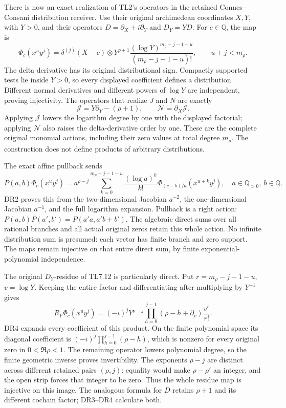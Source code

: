 There is now an exact realization of TL2's operators in the retained
Connes--Consani distribution receiver. Use their original archimedean
coordinates \(X,Y\), with \(Y>0\), and their operators
\(D=\partial_X+i\partial_Y\) and \(D_Y=YD\). For \(c\in\mathbb Q\), the
map is \[
\Phi_c(x^u y^j)=\delta^{(j)}(X-c)\otimes
Y^{\rho+1}\frac{(\log Y)^{m_\rho-j-1-u}}{(m_\rho-j-1-u)!},
\qquad u+j<m_\rho.
\tag{TL7.12}
\] The delta derivative has its original distributional sign. Compactly
supported tests lie inside \(Y>0\), so every displayed coefficient
defines a distribution. Different normal derivatives and different
powers of \(\log Y\) are independent, proving injectivity. The operators
that realize \(J\) and \(N\) are exactly \[
\mathscr J=Y\partial_Y-(\rho+1),\qquad
\mathscr N=\partial_X\mathscr J.
\tag{TL7.13}
\] Applying \(\mathscr J\) lowers the logarithm degree by one with the
displayed factorial; applying \(\mathscr N\) also raises the
delta-derivative order by one. These are the complete original monomial
actions, including their zero values at total degree \(m_\rho\). The
construction does not define products of arbitrary distributions.

The exact affine pullback sends \[
P(a,b)\Phi_c(x^uy^j)=a^{\rho-j}
\sum_{k=0}^{m_\rho-j-1-u}\frac{(\log a)^k}{k!}
\Phi_{(c-b)/a}(x^{u+k}y^j),
\quad a\in\mathbb Q_{>0},\ b\in\mathbb Q.
\tag{TL7.14}
\] DR2 proves this from the two-dimensional Jacobian \(a^{-2}\), the
one-dimensional Jacobian \(a^{-1}\), and the full logarithm expansion.
Pullback is a right action: \(P(a,b)P(a',b')=P(a'a,a'b+b')\). The
algebraic direct sums over all rational branches and all actual original
zeros retain this whole action. No infinite distribution sum is
presumed: each vector has finite branch and zero support. The maps
remain injective on that entire direct sum, by finite
exponential-polynomial independence.

The original \(D_Y\)-residue of TL7.12 is particularly direct. Put
\(r=m_\rho-j-1-u\), \(v=\log Y\). Keeping the entire factor and
differentiating after multiplying by \(Y^{-1}\) gives \[
R_Y\Phi_c(x^uy^j)=(-i)^jY^{\rho-j}
\prod_{h=0}^{j-1}(\rho-h+\partial_v)\frac{v^r}{r!}.
\tag{TL7.15}
\] DR4 expands every coefficient of this product. On the finite
polynomial space its diagonal coefficient is
\((-i)^j\prod_{h=0}^{j-1}(\rho-h)\), which is nonzero for every original
zero in \(0<\Re\rho<1\). The remaining operator lowers polynomial
degree, so the finite geometric inverse proves invertibility. The
exponents \(\rho-j\) are distinct across different retained pairs
\((\rho,j)\): equality would make \(\rho-\rho'\) an integer, and the
open strip forces that integer to be zero. Thus the whole residue map is
injective on this image. The analogous formula for \(D\) retains
\(\rho+1\) and its different cochain factor; DR3--DR4 calculate both.

